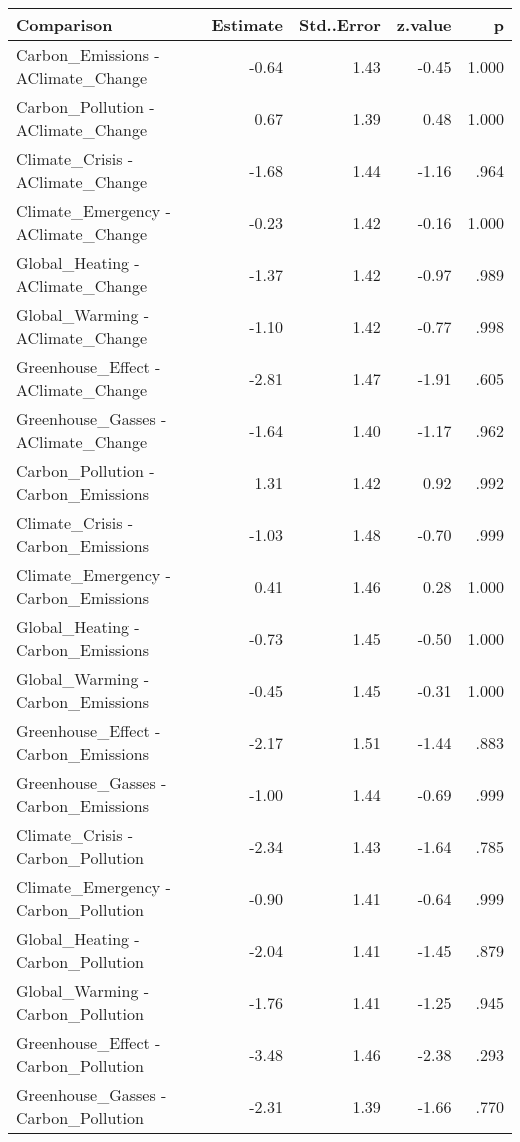 \begin{table}[ht]
\centering
\begin{tabular}{lrrrr}
  \hline
Comparison & Estimate & Std..Error & z.value & p \\ 
  \hline
Carbon\_Emissions - AClimate\_Change & -0.64 & 1.43 & -0.45 & 1.000 \\ 
  Carbon\_Pollution - AClimate\_Change & 0.67 & 1.39 & 0.48 & 1.000 \\ 
  Climate\_Crisis - AClimate\_Change & -1.68 & 1.44 & -1.16 & .964 \\ 
  Climate\_Emergency - AClimate\_Change & -0.23 & 1.42 & -0.16 & 1.000 \\ 
  Global\_Heating - AClimate\_Change & -1.37 & 1.42 & -0.97 & .989 \\ 
  Global\_Warming - AClimate\_Change & -1.10 & 1.42 & -0.77 & .998 \\ 
  Greenhouse\_Effect - AClimate\_Change & -2.81 & 1.47 & -1.91 & .605 \\ 
  Greenhouse\_Gasses - AClimate\_Change & -1.64 & 1.40 & -1.17 & .962 \\ 
  Carbon\_Pollution - Carbon\_Emissions & 1.31 & 1.42 & 0.92 & .992 \\ 
  Climate\_Crisis - Carbon\_Emissions & -1.03 & 1.48 & -0.70 & .999 \\ 
  Climate\_Emergency - Carbon\_Emissions & 0.41 & 1.46 & 0.28 & 1.000 \\ 
  Global\_Heating - Carbon\_Emissions & -0.73 & 1.45 & -0.50 & 1.000 \\ 
  Global\_Warming - Carbon\_Emissions & -0.45 & 1.45 & -0.31 & 1.000 \\ 
  Greenhouse\_Effect - Carbon\_Emissions & -2.17 & 1.51 & -1.44 & .883 \\ 
  Greenhouse\_Gasses - Carbon\_Emissions & -1.00 & 1.44 & -0.69 & .999 \\ 
  Climate\_Crisis - Carbon\_Pollution & -2.34 & 1.43 & -1.64 & .785 \\ 
  Climate\_Emergency - Carbon\_Pollution & -0.90 & 1.41 & -0.64 & .999 \\ 
  Global\_Heating - Carbon\_Pollution & -2.04 & 1.41 & -1.45 & .879 \\ 
  Global\_Warming - Carbon\_Pollution & -1.76 & 1.41 & -1.25 & .945 \\ 
  Greenhouse\_Effect - Carbon\_Pollution & -3.48 & 1.46 & -2.38 & .293 \\ 
  Greenhouse\_Gasses - Carbon\_Pollution & -2.31 & 1.39 & -1.66 & .770 \\ 

\end{tabular}
\end{table}
